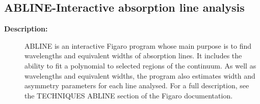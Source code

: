 \subsection{ABLINE-\label{ABLINE}Interactive absorption line analysis}
\begin{description}

\item [{\bf Description:}]
 ABLINE is an interactive Figaro program whose main purpose is to
 find wavelengths and equivalent widths of absorption lines.  It
 includes the ability to fit a polynomial to selected regions of
 the continuum.  As well as wavelengths and equivalent widths, the
 program also estimates width and asymmetry parameters for each
 line analysed.  For a full description, see the TECHNIQUES ABLINE
 section of the Figaro documentation.


\end{description}
